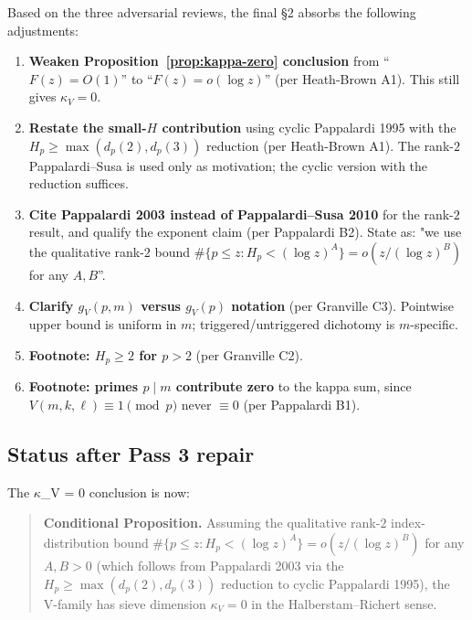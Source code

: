 Based on the three adversarial reviews, the final \S2 absorbs the
following adjustments:

\begin{enumerate}
  \item \textbf{Weaken Proposition~\ref{prop:kappa-zero} conclusion}
    from ``$F(z) = O(1)$'' to ``$F(z) = o(\log z)$'' (per Heath-Brown
    A1). This still gives $\kappa_{V} = 0$.

  \item \textbf{Restate the small-$H$ contribution} using cyclic
    Pappalardi 1995 with the $H_{p} \geq \max(d_{p}(2), d_{p}(3))$
    reduction (per Heath-Brown A1). The rank-$2$ Pappalardi--Susa is
    used only as motivation; the cyclic version with the reduction
    suffices.

  \item \textbf{Cite Pappalardi 2003 instead of Pappalardi--Susa 2010}
    for the rank-$2$ result, and qualify the exponent claim (per
    Pappalardi B2). State as: "we use the qualitative rank-$2$ bound
    $\#\{p \leq z : H_{p} < (\log z)^{A}\} = o(z / (\log z)^{B})$ for
    any $A, B$''.

  \item \textbf{Clarify $g_{V}(p, m)$ versus $g_{V}(p)$ notation}
    (per Granville C3). Pointwise upper bound is uniform in $m$;
    triggered/untriggered dichotomy is $m$-specific.

  \item \textbf{Footnote: $H_{p} \geq 2$ for $p > 2$} (per Granville
    C2).

  \item \textbf{Footnote: primes $p \mid m$ contribute zero} to the
    kappa sum, since $V(m, k, \ell) \equiv 1 \pmod{p}$ never $\equiv
    0$ (per Pappalardi B1).
\end{enumerate}

\subsection*{Status after Pass 3 repair}

The $\kappa$_V = 0 conclusion is now:
\begin{quote}
  \textbf{Conditional Proposition.} Assuming the qualitative
  rank-$2$ index-distribution bound
  $\#\{p \leq z : H_{p} < (\log z)^{A}\} = o(z / (\log z)^{B})$
  for any $A, B > 0$ (which follows from Pappalardi 2003 via the
  $H_{p} \geq \max(d_{p}(2), d_{p}(3))$ reduction to cyclic
  Pappalardi 1995),
  the V-family has sieve dimension $\kappa_{V} = 0$ in the
  Halberstam--Richert sense.
\end{quote}

